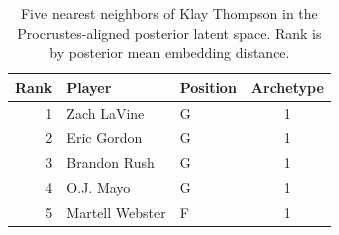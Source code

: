 \begin{table}[htbp]
  \centering\small
  \begin{tabular}{rllc}
    \toprule
    Rank & Player & Position & Archetype \\
    \midrule
    1 & Zach LaVine & G & 1 \\
    2 & Eric Gordon & G & 1 \\
    3 & Brandon Rush & G & 1 \\
    4 & O.J. Mayo & G & 1 \\
    5 & Martell Webster & F & 1 \\
    \bottomrule
  \end{tabular}
  \caption{Five nearest neighbors of Klay Thompson in the Procrustes-aligned posterior latent space. Rank is by posterior mean embedding distance.}
  \label{tab:Klay_Thompson_neighbors}
\end{table}

